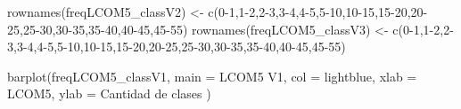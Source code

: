 \documentclass[
]{article}
\newenvironment{Shaded}{\begin{snugshade}}{\end{snugshade}}
\newcommand{\AttributeTok}[1]{\textcolor[rgb]{0.77,0.63,0.00}{#1}}
\newcommand{\FunctionTok}[1]{\textcolor[rgb]{0.00,0.00,0.00}{#1}}
\newcommand{\NormalTok}[1]{#1}
\newcommand{\OtherTok}[1]{\textcolor[rgb]{0.56,0.35,0.01}{#1}}
\newcommand{\StringTok}[1]{\textcolor[rgb]{0.31,0.60,0.02}{#1}}
\begin{document}
\begin{Shaded}
\begin{Highlighting}[]
\FunctionTok{rownames}\NormalTok{(freqLCOM5\_classV2) }\OtherTok{\textless{}{-}} \FunctionTok{c}\NormalTok{(}\StringTok{\textquotesingle{}0{-}1\textquotesingle{}}\NormalTok{,}\StringTok{\textquotesingle{}1{-}2\textquotesingle{}}\NormalTok{,}\StringTok{\textquotesingle{}2{-}3\textquotesingle{}}\NormalTok{,}\StringTok{\textquotesingle{}3{-}4\textquotesingle{}}\NormalTok{,}\StringTok{\textquotesingle{}4{-}5\textquotesingle{}}\NormalTok{,}\StringTok{\textquotesingle{}5{-}10\textquotesingle{}}\NormalTok{,}\StringTok{\textquotesingle{}10{-}15\textquotesingle{}}\NormalTok{,}\StringTok{\textquotesingle{}15{-}20\textquotesingle{}}\NormalTok{,}\StringTok{\textquotesingle{}20{-}25\textquotesingle{}}\NormalTok{,}\StringTok{\textquotesingle{}25{-}30\textquotesingle{}}\NormalTok{,}\StringTok{\textquotesingle{}30{-}35\textquotesingle{}}\NormalTok{,}\StringTok{\textquotesingle{}35{-}40\textquotesingle{}}\NormalTok{,}\StringTok{\textquotesingle{}40{-}45\textquotesingle{}}\NormalTok{,}\StringTok{\textquotesingle{}45{-}55\textquotesingle{}}\NormalTok{)}
\FunctionTok{rownames}\NormalTok{(freqLCOM5\_classV3) }\OtherTok{\textless{}{-}} \FunctionTok{c}\NormalTok{(}\StringTok{\textquotesingle{}0{-}1\textquotesingle{}}\NormalTok{,}\StringTok{\textquotesingle{}1{-}2\textquotesingle{}}\NormalTok{,}\StringTok{\textquotesingle{}2{-}3\textquotesingle{}}\NormalTok{,}\StringTok{\textquotesingle{}3{-}4\textquotesingle{}}\NormalTok{,}\StringTok{\textquotesingle{}4{-}5\textquotesingle{}}\NormalTok{,}\StringTok{\textquotesingle{}5{-}10\textquotesingle{}}\NormalTok{,}\StringTok{\textquotesingle{}10{-}15\textquotesingle{}}\NormalTok{,}\StringTok{\textquotesingle{}15{-}20\textquotesingle{}}\NormalTok{,}\StringTok{\textquotesingle{}20{-}25\textquotesingle{}}\NormalTok{,}\StringTok{\textquotesingle{}25{-}30\textquotesingle{}}\NormalTok{,}\StringTok{\textquotesingle{}30{-}35\textquotesingle{}}\NormalTok{,}\StringTok{\textquotesingle{}35{-}40\textquotesingle{}}\NormalTok{,}\StringTok{\textquotesingle{}40{-}45\textquotesingle{}}\NormalTok{,}\StringTok{\textquotesingle{}45{-}55\textquotesingle{}}\NormalTok{)}

\FunctionTok{barplot}\NormalTok{(freqLCOM5\_classV1,}
        \AttributeTok{main =} \StringTok{\textquotesingle{}LCOM5 V1\textquotesingle{}}\NormalTok{,}
        \AttributeTok{col =} \StringTok{\textquotesingle{}lightblue\textquotesingle{}}\NormalTok{,}
        \AttributeTok{xlab =} \StringTok{\textquotesingle{}LCOM5\textquotesingle{}}\NormalTok{,}
        \AttributeTok{ylab =} \StringTok{\textquotesingle{}Cantidad de clases \textquotesingle{}}\NormalTok{)}
\end{Highlighting}
\end{Shaded}
\end{document}
